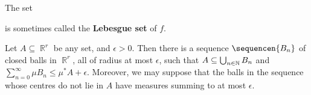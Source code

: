\medskip 
{} The set 
      
      
\noindent is sometimes called the {\bf Lebesgue set} of $f$. 
      
 Let $A\subseteq\BbbR^r$ be any set, and 
$\epsilon>0$.   Then there is a sequence $\sequencen{B_n}$ of closed 
balls in $\BbbR^r$, all of radius at most $\epsilon$, such that 
$A\subseteq\bigcup_{n\in\Bbb N}B_n$ and 
$\sum_{n=0}^{\infty}\mu B_n\le\mu^*A+\epsilon$.   Moreover, we may 
suppose that the balls in the 
sequence whose centres do not lie in $A$ have measures summing to at 
most $\epsilon$. 
      
